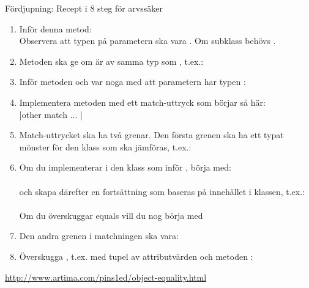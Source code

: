 \begin{Slide}{Fördjupning: Recept i 8 steg för arvssäker }\SlideFontTiny
\SlideOnly{\setlength{\leftmargini}{0pt}}
\begin{enumerate}\SlideFontTiny
\item Inför denna metod: \\Observera att typen på parametern ska vara . Om subklass behövs .

\item Metoden  ska ge  om  är av samma typ som , t.ex.: \\

\item Inför metoden  och var noga med att parametern har typen : \\ 

\item Implementera metoden  med ett match-uttryck som börjar så här: \\
\code|other match { ... } |

\item Match-uttrycket ska ha två grenar. Den första grenen ska ha ett typat mönster för den klass som ska jämföras, t.ex.: \\ 

\item Om du implementerar  i den klass som inför , börja med: \\  \\
och skapa därefter en fortsättning som baseras på innehållet i klassen, t.ex.: \\  \\
Om du överskuggar equals vill du nog börja med

\item Den andra grenen i matchningen ska vara:

\item Överskugga , t.ex. med tupel av attributvärden och metoden \code{##}: \\

\end{enumerate}
\url{http://www.artima.com/pins1ed/object-equality.html}

\end{Slide}


